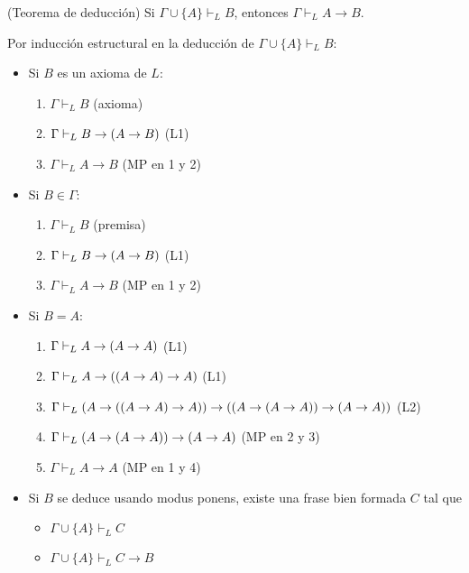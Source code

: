 \begin{proposition}
(Teorema de deducción) Si $\Gamma \cup \{ A \} \vdash_L B$, entonces $\Gamma \vdash_L A \to B$.
\end{proposition}

\begin{prove}
Por inducción estructural en la deducción de $\Gamma \cup \{ A \} \vdash_L B$:

\begin{itemize}
    \item Si $B$ es un axioma de $L$:
    \begin{enumerate}
        \item $\Gamma \vdash_L B$       \hfill (axioma)
        \item $\Gamma \vdash_L B \to (A \to B)$  \hfill (L1)
        \item $\Gamma \vdash_L A \to B$ \hfill (MP en 1 y 2)
    \end{enumerate}
    
    \item Si $B \in \Gamma$:
    \begin{enumerate}
        \item $\Gamma \vdash_L B$       \hfill (premisa)
        \item $\Gamma \vdash_L B \to (A \to B)$  \hfill (L1)
        \item $\Gamma \vdash_L A \to B$ \hfill (MP en 1 y 2)
    \end{enumerate}
    
    \item Si $B = A$:
    \begin{enumerate}
        \item $\Gamma \vdash_L A \to (A \to A)$              \hfill (L1)
        \item $\Gamma \vdash_L A \to ((A \to A) \to A)$ \hfill (L1)
        \item $\Gamma \vdash_L (A \to ((A \to A) \to A)) \to ((A \to (A \to A)) \to (A \to A))$ \hfill (L2)
        \item $\Gamma \vdash_L (A \to (A \to A)) \to (A \to A)$ \hfill (MP en 2 y 3)
        \item $\Gamma \vdash_L A \to A$              \hfill (MP en 1 y 4)
    \end{enumerate}
    
    \item Si $B$ se deduce usando modus ponens, existe una frase bien formada $C$ tal que
    \begin{itemize}
        \item $\Gamma \cup \{ A \} \vdash_L C$
        \item $\Gamma \cup \{ A \} \vdash_L C \to B$
    \end{itemize}
    

\end{itemize}
\end{prove}
